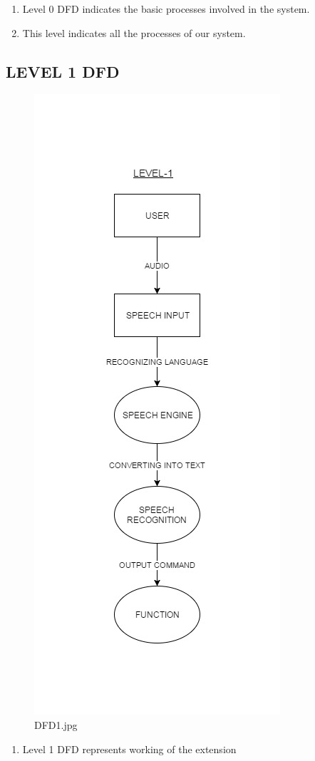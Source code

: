 \documentclass[11pt]{report} %
\begin{document}
\begin{enumerate}
	\item Level 0 DFD indicates the basic processes involved in the system.
	\item This level indicates all the processes of our system.
\end{enumerate}

\subsection{LEVEL 1 DFD}
\label{subsec:LEVEL 1 DFD}
\begin{figure}[h]
	\centering
	\includegraphics[width=0.5\linewidth]{figures/DFD1.jpg}
	\caption{DFD1.jpg}
	\label{fig:DFD1.jpg}
\end{figure}

\begin{enumerate}
	\item Level 1 DFD represents working of the extension
\end{enumerate}
\end{document}

